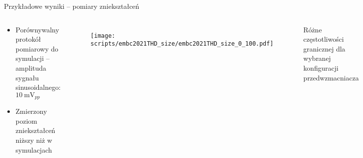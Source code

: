 
\begin{frame}{Przykładowe wyniki -- pomiary zniekształceń}
    \begin{columns}

        \vspace{-1em}
        \begin{block}{}
            \begin{itemize}
                \item Porównywalny protokół pomiarowy do symulacji -- amplituda sygnału sinusoidalnego: $\SI{10}{\milli\volt_{pp}}$
                \item Zmierzony poziom zniekształceń niższy niż w symulacjach
            \end{itemize}
        \end{block}
        \vspace{-1em}

            \begin{figure}[H]
                \centering
                \texttt{[image: scripts/embc2021THD\_size/embc2021THD\_size\_0\_100.pdf]}
            \end{figure}   

            
        Różne częstotliwości granicznej dla wybranej konfiguracji przedwzmacniacza
        \begin{figure}[H]
            \centering
            \texttt{[image: scripts/embc2021THD\_fc/embc2021THD\_fc.pdf]}
        \end{figure}

\end{columns}

\end{frame}


  

